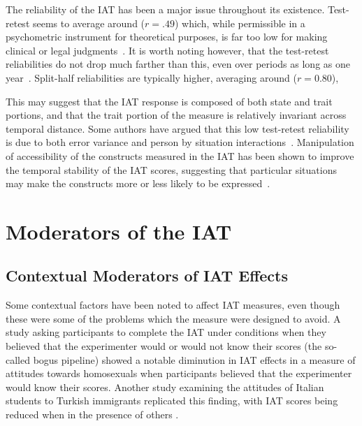 The reliability of the IAT has been a major issue throughout its existence. Test-retest seems to average around ($r=.49$) which, while permissible in a psychometric instrument for theoretical purposes, is far too low for making clinical or legal judgments~\cite{Greenwald2000, Blanton2006d}. It is worth noting however, that the test-retest reliabilities do not drop much farther than this, even over periods as long as one year~\cite{Egloff2005}. 
Split-half reliabilities are typically higher, averaging around ($r=0.80$),  

This may suggest that the IAT response is composed of both state and trait portions, and that the trait portion of the measure is relatively invariant across temporal distance. Some authors have argued that this low test-retest reliability is due to both error variance and person by situation interactions~\cite{Gschwendner2008}.  Manipulation of accessibility of the constructs measured in the IAT has been shown to improve the temporal stability of the IAT scores, suggesting that particular situations may make the constructs more or less likely to be expressed~\cite{Gschwendner2008}. 





\section{Moderators of the IAT}
\label{sec:moderators-iat}



\subsection{Contextual Moderators of IAT Effects}
\label{sec:cont-moder-iat}



Some contextual factors have been noted to affect IAT measures, even though these were some of the problems which the measure were designed to avoid. A study asking participants to complete the IAT under conditions when they believed that the experimenter would or would not know their scores (the so-called bogus pipeline) \cite{Boysen2006} showed a notable diminution in IAT effects in a measure of attitudes towards homosexuals when participants believed that the experimenter would know their scores. %
Another study examining the attitudes of Italian students to Turkish immigrants replicated this finding, with IAT scores being reduced when in the presence of others \cite{Castelli2008}. 

